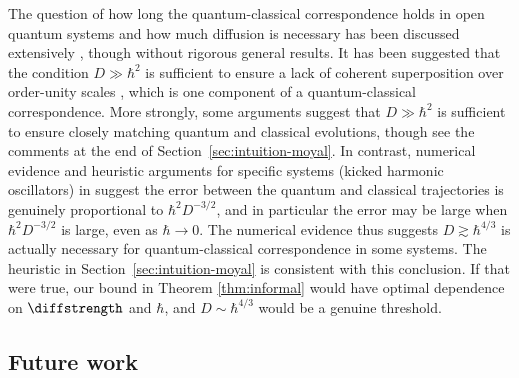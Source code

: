 \documentclass{article}
\numberwithin{equation}{section}
\begin{document}
The question of how long the quantum-classical correspondence holds in open quantum systems and how much diffusion is necessary has been discussed extensively \cite{zurek1994decoherence,zurek1995zurek, habib1998decoherence,bhattacharya2000continuous,bhattacharya2003continuous,toscano2005decoherence,toscano2006quantum,wisniacki2009scaling}, though without rigorous general results. It has been suggested that the condition $D \gg \hbar^2$ is sufficient to ensure a lack of coherent superposition over order-unity scales \cite{zurek1994decoherence}, which is one component of a quantum-classical correspondence.  More strongly, some arguments suggest that $D \gg \hbar^2$ is sufficient \cite{zurek2003decoherence,kolovsky1994remark,kolovsky1996condition, pattanayak2003parameter, gammal2007quantum} to ensure closely matching quantum and classical evolutions, though see the comments at the end of Section~\ref{sec:intuition-moyal}. In contrast, numerical evidence and heuristic arguments for specific systems (kicked harmonic oscillators) in \cite{toscano2005decoherence,toscano2006quantum,wisniacki2009scaling} suggest the error between the quantum and classical trajectories is genuinely proportional to $\hbar^2 D^{-3/2}$, and in particular the error may be large when $\hbar^2 D^{-3/2}$ is large, even as $\hbar \to 0$. The numerical evidence thus suggests $D \gtrsim \hbar^{4/3}$ is actually necessary for quantum-classical correspondence in some systems.  The heuristic in Section~\ref{sec:intuition-moyal} is consistent with this conclusion.  If that were true, our bound in Theorem \ref{thm:informal} would have optimal dependence on $\diffstrength$ and  $\hbar$, and $D \sim \hbar^{4/3}$ would be a genuine threshold.







\subsection{Future work}\label{sec:future-work}
\end{document}
